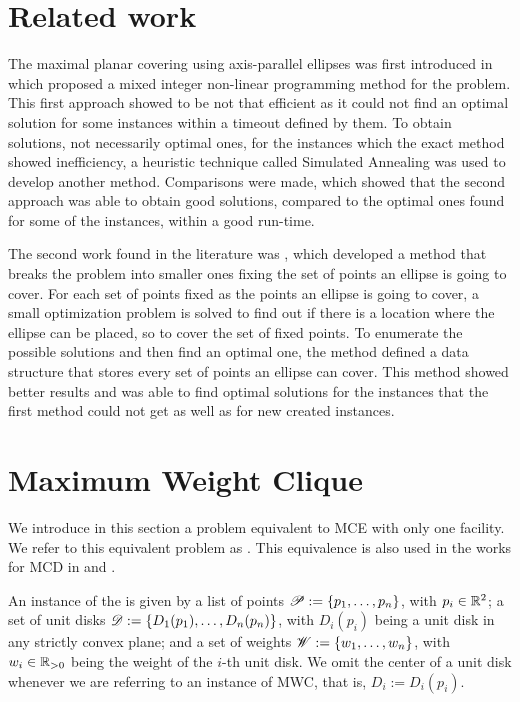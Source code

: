\section{Related work}
The maximal planar covering using axis-parallel ellipses was first introduced in  which proposed a mixed integer non-linear programming method for the problem. This first approach showed to be not that efficient as it could not find an optimal solution for some instances within a timeout defined by them. To obtain solutions, not necessarily optimal ones, for the instances which the exact method showed inefficiency, a heuristic technique called Simulated Annealing was used to develop another method. Comparisons were made, which showed that the second approach was able to obtain good solutions, compared to the optimal ones found for some of the instances, within a good run-time.

The second work found in the literature was , which developed a method that breaks the problem into smaller ones fixing the set of points an ellipse is going to cover. For each set of points fixed as the points an ellipse is going to cover, a small optimization problem is solved to find out if there is a location where the ellipse can be placed, so to cover the set of fixed points. To enumerate the possible solutions and then find an optimal one, the method defined a data structure that stores every set of points an ellipse can cover. This method showed better results and was able to find optimal solutions for the instances that the first method could not get as well as for new created instances.

\section{Maximum Weight Clique}

We introduce in this section a problem equivalent to MCE with only one facility. We refer to this equivalent problem as . This equivalence is also used in the works for MCD in  and .

An instance of the  is given by a list of points \mbox{$\mathscr{P}:=\{p_1,\dots,p_n\}$}, with $p_i \in \mathbb{R}^2$; 
a set of unit disks $\mathscr{D}:=\{D_1(p_1), \dots, D_n(p_n)\}$, with $D_i(p_i)$ being a unit disk in any strictly convex plane; and a set of weights \mbox{$\mathscr{W}:=\{w_1, \dots, w_n\}$}, with $w_i\in \mathbb{R}_{>0}$ being the weight of the $i$-th unit disk. We omit the center of a unit disk whenever we are referring to an instance of MWC, that is, $D_i:=D_i(p_i)$.


